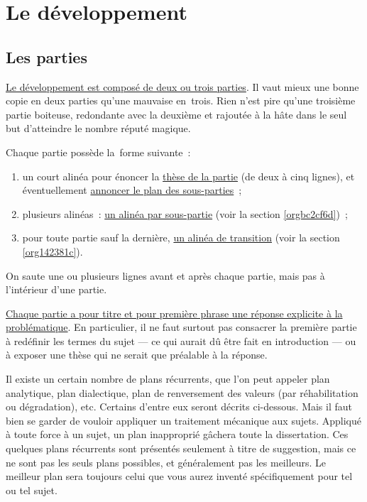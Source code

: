 \documentclass[a4paper,12pt]{report}
\begin{document}
\chapter{Le développement}
\label{sec:orgd1dce66}
\label{org4a22d50}

\section{Les parties}
\label{sec:org2f18151}
\label{orgb91b55e}

\uline{Le développement est composé de deux ou trois parties}. Il vaut mieux
une bonne copie en deux parties qu'une mauvaise en trois. Rien n'est
pire qu'une troisième partie boiteuse, redondante avec la deuxième et
rajoutée à la hâte dans le seul but d'atteindre le nombre réputé
magique.

Chaque partie possède la forme suivante :

\begin{enumerate}
\item un court alinéa pour énoncer la \uline{thèse de la partie} (de deux à cinq
lignes), et éventuellement \uline{annoncer le plan des sous-parties} ;
\item plusieurs alinéas : \uline{un alinéa par sous-partie} (voir la section
\ref{orgbc2cf6d}) ;
\item pour toute partie sauf la dernière, \uline{un alinéa de transition} (voir
la section \ref{org142381c}).
\end{enumerate}

On saute une ou plusieurs lignes avant et après chaque partie, mais pas
à l'intérieur d'une partie.

\uline{Chaque partie a pour titre et pour première phrase une réponse
explicite à la problématique}. En particulier, il ne faut surtout pas
consacrer la première partie à redéfinir les termes du sujet --- ce qui
aurait dû être fait en introduction --- ou à exposer une thèse qui ne
serait que préalable à la réponse.

Il existe un certain nombre de plans récurrents, que l'on peut appeler
plan analytique, plan dialectique, plan de renversement des valeurs (par
réhabilitation ou dégradation), etc. Certains d'entre eux seront décrits
ci-dessous. Mais il faut bien se garder de vouloir appliquer un
traitement mécanique aux sujets. Appliqué à toute force à un sujet, un
plan inapproprié gâchera toute la dissertation. Ces quelques plans
récurrents sont présentés seulement à titre de suggestion, mais ce ne
sont pas les seuls plans possibles, et généralement pas les meilleurs.
Le meilleur plan sera toujours celui que vous aurez inventé
spécifiquement pour tel ou tel sujet.
\end{document}
